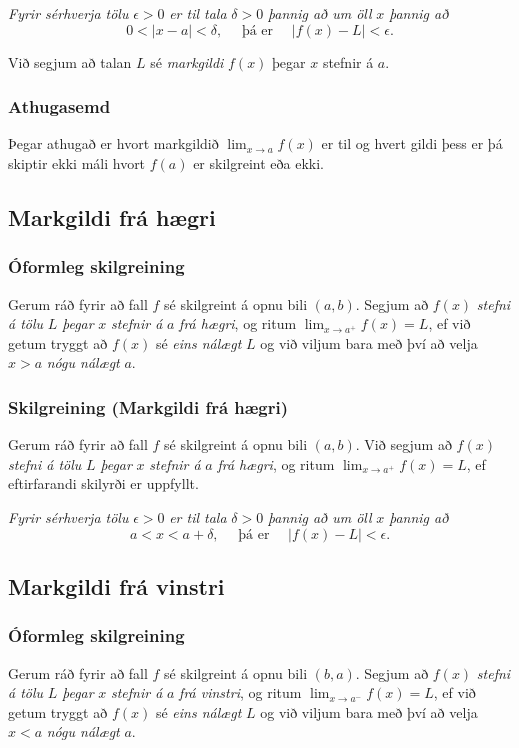 \documentclass[icelandic,a4paper,12pt]{article}
\begin{document}
\emph{Fyrir sérhverja tölu} $\epsilon>0$ \emph{er til tala} $\delta>0$ 
\emph{þannig að um öll} $x$ \emph{þannig að}
$$
0<|x-a|<\delta,\quad \text{ þá er } \quad |f(x)-L|<\epsilon.
$$

Við segjum að talan $L$ sé \emph{markgildi} $f(x)$ þegar $x$ stefnir á $a$.

\pause

\subsubsection{Athugasemd}  Þegar athugað er hvort markgildið
$\lim_{x\rightarrow a} f(x)$ er til og hvert gildi þess er þá skiptir
ekki máli hvort $f(a)$ er skilgreint eða ekki.

\subsection{Markgildi frá hægri}
\subsubsection{Óformleg skilgreining}   
Gerum ráð fyrir að fall $f$ sé
skilgreint á opnu bili $(a,b)$.  Segjum að  $f(x)$
\emph{stefni á tölu} $L$ \emph{þegar} $x$ \emph{stefnir á} $a$ \emph{frá hægri}, og ritum
$\lim_{x\rightarrow a^+} f(x)=L$, ef við getum tryggt að  $f(x)$ sé 
\emph{eins nálægt}
$L$ og við viljum bara með því að velja $x>a$ \emph{nógu nálægt} $a$. 

\pause

\subsubsection{Skilgreining (Markgildi frá hægri)} Gerum ráð fyrir að fall $f$ sé
skilgreint á opnu bili $(a,b)$.  Við segjum að $f(x)$
\emph{stefni á tölu} $L$ \emph{þegar} $x$ \emph{stefnir á} $a$ \emph{frá hægri}, og ritum
$\lim_{x\rightarrow a^+} f(x)=L$, ef eftirfarandi skilyrði er uppfyllt.

\emph{Fyrir sérhverja tölu} $\epsilon>0$ \emph{er til tala} $\delta>0$ \emph{þannig 
að um öll} $x$ \emph{þannig að} 
$$
a<x<a+\delta,\quad \text{ þá er } \quad |f(x)-L|<\epsilon.
$$

\subsection{Markgildi frá vinstri}
\subsubsection{Óformleg skilgreining}   
Gerum ráð fyrir að fall $f$ sé
skilgreint á opnu bili $(b,a)$.  Segjum að  $f(x)$
\emph{stefni á tölu} $L$ \emph{þegar} $x$ \emph{stefnir á} $a$ \emph{frá vinstri}, og ritum
$\lim_{x\rightarrow a^-} f(x)=L$, ef við getum tryggt að  $f(x)$ sé 
\emph{eins nálægt}
$L$ og við viljum bara með því að velja $x<a$ \emph{nógu nálægt} $a$. 
\end{document}
